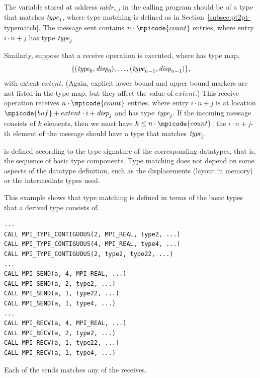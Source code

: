 The variable stored at address $addr_{i,j}$ in the calling program
should be of a type that matches $\textrm{\itshape{type}}_j$, where
type matching is defined as in Section~\ref{subsec:pt2pt-typematch}.
The message sent contains $n \cdot \mpicode{count}$ entries, where entry
$i \cdot n +j$ has type $\textrm{\itshape{type}}_j$.

Similarly, suppose that a receive operation
 is
executed, where  has type map,
\begin{displaymath}
\{(\textrm{\itshape{type}}_0, \textrm{\itshape{disp}}_0) ,\ldots,(\textrm{\itshape{type}}_{n-1}, \textrm{\itshape{disp}}_{n-1}) \},
\end{displaymath}
\noindent
with extent $extent$.  (Again,  explicit lower bound and upper bound markers are not listed in the type map, but
they affect the value of $extent$.)
This receive operation receives
$n \cdot \mpicode{count}$ entries, where entry $i \cdot n + j$ is at location
$\mpicode{buf} + extent \cdot i + \mword{disp}_j$
and has type $\textrm{\itshape{type}}_j$.  If the incoming message consists of $k$
elements, then we must have $k \le n \cdot \mpicode{count}$; the $i \cdot n +
j$-th element of the message should have a type that matches $\textrm{\itshape{type}}_j$.

is defined according to the type signature of
the corresponding datatypes, that is, the sequence of basic type
components.  Type matching does not depend on some aspects of the
datatype definition, such as the displacements (layout in memory) or the
intermediate types used.

\begin{example}
\label{pt2pt-exAA}
%
%
This example shows that type matching is defined in terms of
the basic types that a derived type consists of.
\begin{lstlisting}[language={[MPI]Fortran}]
...
CALL MPI_TYPE_CONTIGUOUS(2, MPI_REAL, type2, ...)
CALL MPI_TYPE_CONTIGUOUS(4, MPI_REAL, type4, ...)
CALL MPI_TYPE_CONTIGUOUS(2, type2, type22, ...)
...
CALL MPI_SEND(a, 4, MPI_REAL, ...)
CALL MPI_SEND(a, 2, type2, ...)
CALL MPI_SEND(a, 1, type22, ...)
CALL MPI_SEND(a, 1, type4, ...)
...
CALL MPI_RECV(a, 4, MPI_REAL, ...)
CALL MPI_RECV(a, 2, type2, ...)
CALL MPI_RECV(a, 1, type22, ...)
CALL MPI_RECV(a, 1, type4, ...)
\end{lstlisting}
Each of the sends matches any of the receives.
\end{example}

